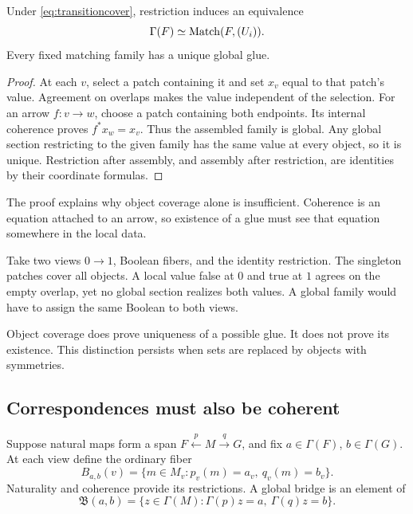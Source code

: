 \begin{theorem}\label{KS04}
Under \eqref{eq:transitioncover}, restriction induces an equivalence
\[
 \Gamma(F)\simeq\operatorname{Match}(F,(U_i)).
\]
Every fixed matching family has a unique global glue.
\end{theorem}
\begin{proof}
At each \(v\), select a patch containing it and set \(x_v\) equal to that patch's value. Agreement on overlaps makes the value independent of the selection. For an arrow \(f:v\to w\), choose a patch containing both endpoints. Its internal coherence proves \(f^*x_w=x_v\). Thus the assembled family is global. Any global section restricting to the given family has the same value at every object, so it is unique. Restriction after assembly, and assembly after restriction, are identities by their coordinate formulas.
\end{proof}
The proof explains why object coverage alone is insufficient. Coherence is an equation attached to an arrow, so existence of a glue must see that equation somewhere in the local data.

\begin{example}\label{KS05}
Take two views \(0\to1\), Boolean fibers, and the identity restriction. The singleton patches cover all objects. A local value false at \(0\) and true at \(1\) agrees on the empty overlap, yet no global section realizes both values. A global family would have to assign the same Boolean to both views.
\end{example}
Object coverage does prove uniqueness of a possible glue. It does not prove its existence. This distinction persists when sets are replaced by objects with symmetries.

\subsection{Correspondences must also be coherent}
Suppose natural maps form a span \(F\xleftarrow{p}M\xrightarrow{q}G\), and fix \(a\in\Gamma(F)\), \(b\in\Gamma(G)\). At each view define the ordinary fiber
\[
 B_{a,b}(v)=\{m\in M_v:p_v(m)=a_v,\ q_v(m)=b_v\}.
\]
Naturality and coherence provide its restrictions. A global bridge is an element of
\[
 \mathfrak B(a,b)=\{z\in\Gamma(M):\Gamma(p)z=a,\ \Gamma(q)z=b\}.
\]

